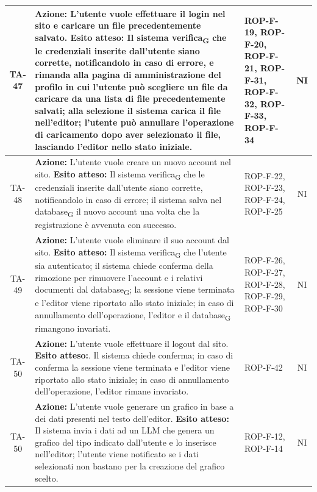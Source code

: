 \documentclass[11pt,a4paper]{article}
\newcommand{\gls}[1]{#1\textsubscript{G}}
\begin{document}
\begin{longtable}{|c|p{9cm}|p{3cm}|c|}
\hline
TA-47 & \textbf{Azione:} L'utente vuole effettuare il login nel sito e caricare un file precedentemente salvato. \newline \textbf{Esito atteso:} Il sistema \gls{verifica} che le credenziali inserite dall'utente siano corrette, notificandolo in caso di errore, e rimanda alla pagina di amministrazione del profilo in cui l'utente può scegliere un file da caricare da una lista di file precedentemente salvati; alla selezione il sistema carica il file nell'editor; l'utente può annullare l'operazione di caricamento dopo aver selezionato il file, lasciando l'editor nello stato iniziale. & ROP-F-19, ROP-F-20, ROP-F-21, ROP-F-31, ROP-F-32, ROP-F-33, ROP-F-34  & NI \\
\hline
TA-48 & \textbf{Azione:} L'utente vuole creare un nuovo account nel sito. \newline \textbf{Esito atteso:} Il sistema \gls{verifica} che le credenziali inserite dall'utente siano corrette, notificandolo in caso di errore; il sistema salva nel \gls{database} il nuovo account una volta che la registrazione è avvenuta con successo. & ROP-F-22, ROP-F-23, ROP-F-24, ROP-F-25 & NI \\
\hline
TA-49 & \textbf{Azione:} L'utente vuole eliminare il suo account dal sito. \newline \textbf{Esito atteso:} Il sistema \gls{verifica} che l'utente sia autenticato; il sistema chiede conferma della rimozione per rimuovere l'account e i relativi documenti dal \gls{database}; la sessione viene terminata e l'editor viene riportato allo stato iniziale; in caso di annullamento dell'operazione, l'editor e il \gls{database} rimangono invariati. & ROP-F-26, ROP-F-27, ROP-F-28, ROP-F-29, ROP-F-30 & NI \\
\hline
TA-50 & \textbf{Azione:} L'utente vuole effettuare il logout dal sito. \newline \textbf{Esito atteso:}. Il sistema chiede conferma; in caso di conferma la sessione viene terminata e l'editor viene riportato allo stato iniziale; in caso di annullamento dell'operazione, l'editor rimane invariato. & ROP-F-42 & NI \\
\hline
TA-50 & \textbf{Azione:} L'utente vuole generare un grafico in base a dei dati presenti nel testo dell'editor. \newline \textbf{Esito atteso:} Il sistema invia i dati ad un LLM che genera un grafico del tipo indicato dall'utente e lo inserisce nell'editor; l'utente viene notificato se i dati selezionati non bastano per la creazione del grafico scelto. & ROP-F-12, ROP-F-14 & NI \\

\end{longtable}
\end{document}
